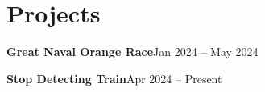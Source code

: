 \section{Projects}
    \resumeSubHeadingListStart

      \resumeProjectHeading
        {\textbf{Great Naval Orange Race}}{Jan 2024 -- May 2024}
        \resumeItemListStart
        \resumeItemListEnd

\resumeProjectHeading
        {\textbf{Stop Detecting Train}}{Apr 2024 -- Present}
        \resumeItemListStart
        \resumeItemListEnd

    \resumeSubHeadingListEnd
